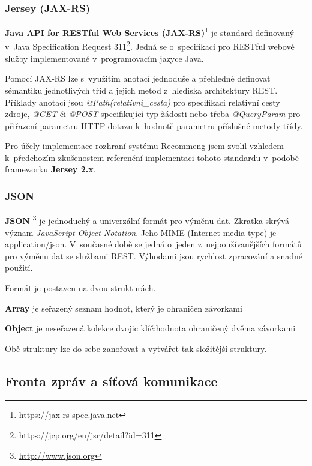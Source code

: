 \documentclass[thesis=M,czech]{FITthesis}[2014/05/07]
\begin{document}
\subsubsection{Jersey (JAX-RS)}
\textbf{Java API for RESTful Web Services (JAX-RS)}\footnote{https://jax-rs-spec.java.net} je standard definovaný v~Java Specification Request 311\footnote{https://jcp.org/en/jsr/detail?id=311}. Jedná se o~specifikaci pro RESTful webové služby implementované v~programovacím jazyce Java.

Pomocí JAX-RS lze s~využitím anotací jednoduše a přehledně definovat sémantiku jednotlivých tříd a jejich metod z~hlediska architektury REST. Příklady anotací jsou \emph{@Path(relativni\_cesta)} pro specifikaci relativní cesty zdroje, \emph{@GET} či \emph{@POST} specifikující typ žádosti nebo třeba \emph{@QueryParam} pro přiřazení parametru HTTP dotazu k~hodnotě parametru příslušné metody třídy.

Pro účely implementace rozhraní systému Recommeng jsem zvolil vzhledem k~předchozím zkušenostem referenční implementaci tohoto standardu v~podobě frameworku \textbf{Jersey 2.x}. 

\subsubsection{JSON}
\label{json}
\textbf{JSON }\footnote{\url{http://www.json.org}} je jednoduchý a univerzální formát pro výměnu dat. Zkratka skrývá význam \emph{JavaScript Object Notation}. Jeho MIME (Internet media type) je application/json. V~současné době se jedná o~jeden z~nejpoužívanějších formátů pro výměnu dat se službami REST. Výhodami jsou rychlost zpracování a snadné použití.

Formát je postaven na dvou strukturách. 

\begin{description}
	\item \textbf{Array} je seřazený seznam hodnot, který je ohraničen závorkami
	\item \textbf{Object} je neseřazená kolekce dvojic klíč:hodnota ohraničený dvěma závorkami
\end{description}

Obě struktury lze do sebe zanořovat a vytvářet tak složitější struktury.

\subsection{Fronta zpráv a síťová komunikace}
\end{document}
